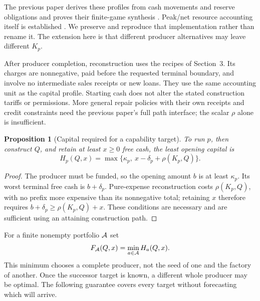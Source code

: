 \documentclass[11pt,letterpaper]{article}
\newtheorem{proposition}[theorem]{Proposition}
\theoremstyle{definition}\newtheorem{definition}[theorem]{Definition}
\theoremstyle{remark}\newtheorem{remark}[theorem]{Remark}
\begin{document}
The previous paper derives these profiles from cash movements and reserve obligations and proves their finite-game synthesis \cite{previous}. Peak/net resource accounting itself is established \cite{kahn}. We preserve and reproduce that implementation rather than rename it. The extension here is that different producer alternatives may leave different $K_p$.

After producer completion, reconstruction uses the recipes of Section~3. Its charges are nonnegative, paid before the requested terminal boundary, and involve no intermediate sales receipts or new loans. They use the same accounting unit as the capital profile. Starting cash does not alter the stated construction tariffs or permissions. More general repair policies with their own receipts and credit constraints need the previous paper's full path interface; the scalar $\rho$ alone is insufficient.

\begin{proposition}[Capital required for a capability target]
\label{prop:capital}
To run $p$, then construct $Q$, and retain at least $x\ge0$ free cash, the least opening capital is
\begin{equation}
 H_p(Q,x)=\max\{\kappa_p,\ x-\delta_p+\rho(K_p,Q)\}.
 \label{eq:H}
\end{equation}
\end{proposition}
\begin{proof}
The producer must be funded, so the opening amount $b$ is at least $\kappa_p$. Its worst terminal free cash is $b+\delta_p$. Pure-expense reconstruction costs $\rho(K_p,Q)$, with no prefix more expensive than its nonnegative total; retaining $x$ therefore requires $b+\delta_p\ge \rho(K_p,Q)+x$. These conditions are necessary and are sufficient using an attaining construction path.
\end{proof}

For a finite nonempty portfolio $\mathcal A$ set
\begin{equation}
 F_\mathcal A(Q,x)=\min_{a\in\mathcal A}H_a(Q,x).
 \label{eq:portfolio}
\end{equation}
This minimum chooses a complete producer, not the seed of one and the factory of another. Once the successor target is known, a different whole producer may be optimal. The following guarantee covers every target without forecasting which will arrive.
\end{document}
